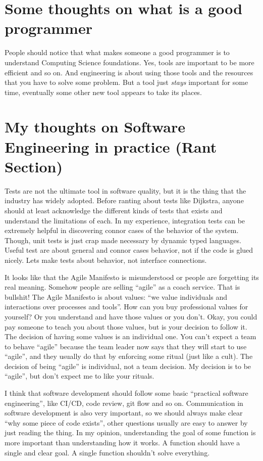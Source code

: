 \documentclass[11pt,a4paper,sans]{moderncv}
\begin{document}
\section{Some thoughts on what is a good programmer}
People should notice that what makes someone a good programmer is to understand Computing Science foundations.
Yes, tools are important to be more efficient and so on.
And engineering is about using those tools and the resources that you have to solve some problem.
But a tool just \textit{stays} important for some time, eventually some other new tool appears to take its places.


\section{My thoughts on Software Engineering in practice (Rant Section)}
Tests are not the ultimate tool in software
quality, but it is the thing that the industry has widely adopted.
Before ranting about tests like Dijkstra, anyone should at least acknowledge
the different kinds of tests that exists and understand the limitations of each.
In my experience, integration tests can be extremely helpful in discovering
connor cases of the behavior of the system. Though, unit tests is just crap
made necessary by dynamic typed languages. Useful test are about general
and connor cases behavior, not if the code is glued nicely. Lets make tests
about behavior, not interface connections.

It looks like that the Agile Manifesto is misunderstood or people are
forgetting its real meaning. Somehow people are selling ``agile'' as a
coach service. That is bullshit! The Agile Manifesto is about values:
``we value individuals and interactions over processes and tools''.
How can you buy professional values for yourself? Or you understand
and have those values or you don't. Okay, you could pay someone to
teach you about those values, but is your decision to follow it. The
decision of having some values is an individual one. You can't expect
a team to behave ``agile'' because the team leader now says that they
will start to use ``agile'', and they usually do that by enforcing
some ritual (just like a cult).  The decision of being ``agile'' is
individual, not a team decision.  My decision is to be ``agile'', but
don't expect me to like your rituals.

I think that software development should follow some basic ``practical
software engineering'', like CI/CD, code review, git flow and so on.
Communication in software development is also very important, so we should
always make clear ``why some piece of code exists'', other questions
usually are easy to answer by just reading the thing. In my opinion,
understanding the goal of some function is more important than
understanding how it works. A function should have a single and clear
goal. A single function shouldn't solve everything.
\end{document}
